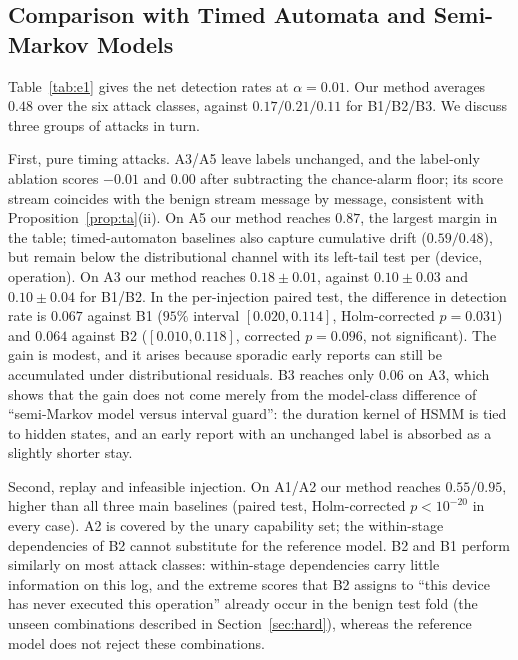 \documentclass[manuscript,screen,review]{acmart}
\begin{document}
\subsection{Comparison with Timed Automata and Semi-Markov Models}
\label{sec:e1}

Table~\ref{tab:e1} gives the net detection rates at $\alpha=0.01$. Our method averages $0.48$ over the six attack classes, against $0.17/0.21/0.11$ for {B1}/{B2}/{B3}. We discuss three groups of attacks in turn.

First, pure timing attacks. {A3}/{A5} leave labels unchanged, and the label-only ablation scores $-0.01$ and $0.00$ after subtracting the chance-alarm floor; its score stream coincides with the benign stream message by message, consistent with Proposition~\ref{prop:ta}(ii). On {A5} our method reaches $0.87$, the largest margin in the table; timed-automaton baselines also capture cumulative drift ($0.59/0.48$), but remain below the distributional channel with its left-tail test per (device, operation). On {A3} our method reaches $0.18{\pm}0.01$, against $0.10{\pm}0.03$ and $0.10{\pm}0.04$ for {B1}/{B2}. In the per-injection paired test, the difference in detection rate is $0.067$ against {B1} ($95\%$ interval $[0.020,0.114]$, Holm-corrected $p=0.031$) and $0.064$ against {B2} ($[0.010,0.118]$, corrected $p=0.096$, not significant). The gain is modest, and it arises because sporadic early reports can still be accumulated under distributional residuals. {B3} reaches only $0.06$ on {A3}, which shows that the gain does not come merely from the model-class difference of ``semi-Markov model versus interval guard'': the duration kernel of {HSMM} is tied to hidden states, and an early report with an unchanged label is absorbed as a slightly shorter stay.

Second, replay and infeasible injection. On {A1}/{A2} our method reaches $0.55/0.95$, higher than all three main baselines (paired test, Holm-corrected $p<10^{-20}$ in every case). {A2} is covered by the unary capability set; the within-stage dependencies of {B2} cannot substitute for the reference model. {B2} and {B1} perform similarly on most attack classes: within-stage dependencies carry little information on this log, and the extreme scores that {B2} assigns to ``this device has never executed this operation'' already occur in the benign test fold (the unseen combinations described in Section~\ref{sec:hard}), whereas the reference model does not reject these combinations.
\end{document}
